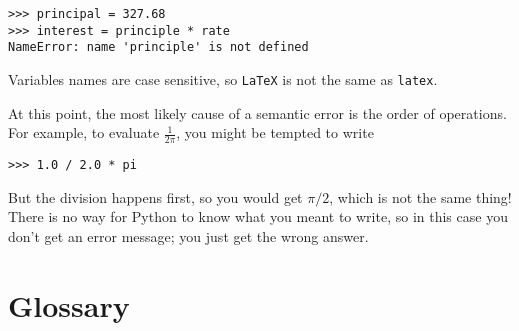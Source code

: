\beforeverb
\begin{verbatim}
>>> principal = 327.68
>>> interest = principle * rate
NameError: name 'principle' is not defined
\end{verbatim}
\afterverb
%
Variables names are case sensitive, so {\tt LaTeX} is not the
same as {\tt latex}.


At this point, the most likely cause of a semantic error is
the order of operations.  For example, to evaluate $\frac{1}{2 \pi}$,
you might be tempted to write

\beforeverb
\begin{verbatim}
>>> 1.0 / 2.0 * pi
\end{verbatim}
\afterverb
%
But the division happens first, so you would get $\pi / 2$, which
is not the same thing!  There is no way for Python
to know what you meant to write, so in this case you don't
get an error message; you just get the wrong answer.



\section{Glossary}

